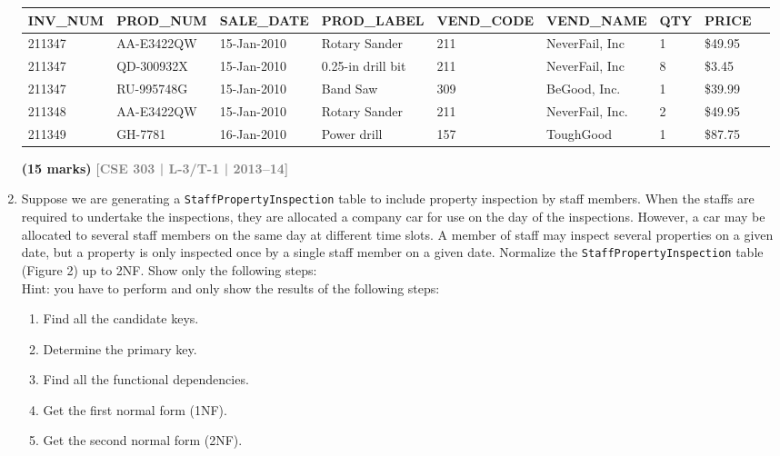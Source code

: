 \documentclass[12pt,a3paper]{article}
\newcommand{\yr}[1]{\hfill\textcolor{gray}{\small\textbf{[#1]}}}
\newcommand{\mk}[1]{\textcolor{orange!70!black}{\small\textbf{(#1 marks)}}}
\begin{document}
\begin{enumerate}
\medskip
\begin{center}
\small
\begin{tabular}{lllllllll}
\toprule
\textbf{INV\_NUM} & \textbf{PROD\_NUM} & \textbf{SALE\_DATE} & \textbf{PROD\_LABEL} & \textbf{VEND\_CODE} & \textbf{VEND\_NAME} & \textbf{QTY} & \textbf{PRICE}\\
\midrule
211347 & AA-E3422QW & 15-Jan-2010 & Rotary Sander & 211 & NeverFail, Inc & 1 & \$49.95\\
211347 & QD-300932X & 15-Jan-2010 & 0.25-in drill bit & 211 & NeverFail, Inc & 8 & \$3.45\\
211347 & RU-995748G & 15-Jan-2010 & Band Saw & 309 & BeGood, Inc. & 1 & \$39.99\\
211348 & AA-E3422QW & 15-Jan-2010 & Rotary Sander & 211 & NeverFail, Inc. & 2 & \$49.95\\
211349 & GH-7781 & 16-Jan-2010 & Power drill & 157 & ToughGood & 1 & \$87.75\\
\bottomrule
\end{tabular}
\end{center}
\mk{15} \yr{CSE 303 | L-3/T-1 | 2013--14}

\item Suppose we are generating a \texttt{StaffPropertyInspection} table to include property inspection
by staff members. When the staffs are required to undertake the inspections, they are
allocated a company car for use on the day of the inspections. However, a car may be allocated
to several staff members on the same day at different time slots. A member of staff
may inspect several properties on a given date, but a property is only inspected once by a
single staff member on a given date.
Normalize the \texttt{StaffPropertyInspection} table (Figure 2) up to 2NF. Show only the following steps:\\
Hint: you have to perform and only show the results of the following steps:
\begin{enumerate}
  \item Find all the candidate keys.
  \item Determine the primary key.
  \item Find all the functional dependencies.
  \item Get the first normal form (1NF).
  \item Get the second normal form (2NF).
\end{enumerate}


\end{enumerate}
\end{document}
